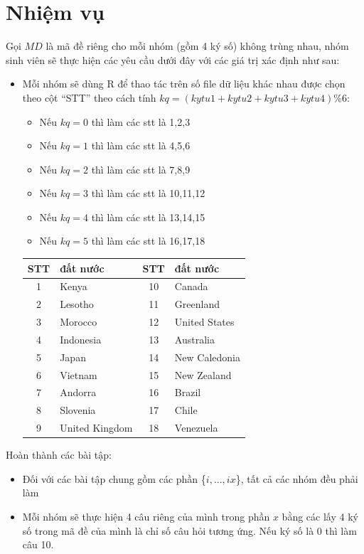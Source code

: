 \documentclass[a4paper]{article}
\theoremstyle{definition}
\begin{document}
\section{Nhiệm vụ}\label{requirement} 
Gọi $MD$ là mã đề riêng cho mỗi nhóm (gồm 4 ký số) không trùng nhau, nhóm sinh viên sẽ thực hiện các yêu cầu dưới đây với các giá trị xác định như sau:
\begin{itemize}
	\item  Mỗi nhóm sẽ dùng R để thao tác trên số file dữ liệu khác nhau được chọn theo cột ``STT'' theo cách tính $kq = (kytu1  +  kytu2 +  kytu3 +  kytu4) \% 6$:
	\begin{itemize}
	    \item Nếu $kq = 0$ thì làm các stt là {1,2,3}
	    \item Nếu $kq = 1$ thì làm các stt là {4,5,6}
	    \item Nếu $kq = 2$ thì làm các stt là {7,8,9}
	    \item Nếu $kq = 3$ thì làm các stt là {10,11,12} 
	    \item Nếu $kq = 4$ thì làm các stt là {13,14,15}
	    \item Nếu $kq = 5$ thì làm các stt là {16,17,18}
	\end{itemize}
	
	\begin{center}
      \begin{tabular}{ c | l | c | l}
        
        STT & đất nước & STT & đất nước\\ \hline
        1 & Kenya & 10 & Canada\\ 
        2 & Lesotho &  11 & Greenland\\ 
        3 & Morocco &  12 & United States\\ 
        4 & Indonesia & 13 & Australia \\ 
        5 & Japan  & 14 & New Caledonia\\
        6 & Vietnam  & 15 & New Zealand\\ 
        7 & Andorra  & 16 & Brazil\\ 
        8 & Slovenia  & 17 & Chile\\ 
        9 & United Kingdom & 18 & Venezuela \\
          
        \hline
      \end{tabular}
\end{center}
\end{itemize}

Hoàn thành các bài tập:
\begin{itemize}
	\item Đối với các bài tập chung gồm các phần \{{\it $i, ..., ix$}\}, tất cả các nhóm đều phải làm
	\item Mỗi nhóm sẽ thực hiện 4 câu riêng của mình trong phần {\it $x$} bằng các lấy 4 ký số trong mã đề của mình là chỉ số câu hỏi tương ứng. Nếu ký số là 0 thì làm câu 10.
\end{itemize}
\end{document}

